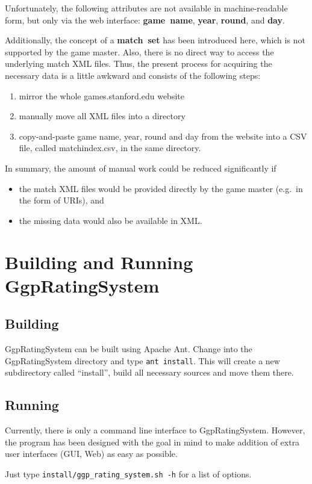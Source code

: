 \documentclass[a4paper,10pt]{article}
\begin{document}
Unfortunately, the following attributes are not available in machine-readable form, but only via the web interface:
\textbf{game~name}, \textbf{year}, \textbf{round}, and \textbf{day}.

Additionally, the concept of a \textbf{match~set} has been introduced here, which is not supported by the game master. Also, there is no direct way to access the underlying match XML files. Thus, the present process for acquiring the necessary data is a little awkward and consists of the following steps:
\begin{enumerate}
 \item mirror the whole games.stanford.edu website
 \item manually move all XML files into a directory
 \item copy-and-paste game name, year, round and day from the website into a CSV file, called matchindex.csv, in the same directory.
\end{enumerate}

In summary, the amount of manual work could be reduced significantly if 
\begin{itemize}
	\item the match XML files would be provided directly by the game master (e.g.\ in the form of URIs), and
	\item the missing data would also be available in XML.
\end{itemize}


\section{Building and Running GgpRatingSystem}
\subsection{Building}
GgpRatingSystem can be built using Apache Ant. Change into the GgpRatingSystem directory and type \texttt{ant install}. This will create a new subdirectory called ``install'', build all necessary sources and move them there.

\subsection{Running}
Currently, there is only a command line interface to GgpRatingSystem. However, the program has been designed with the goal in mind to make addition of extra user interfaces (GUI, Web) as easy as possible.

Just type \texttt{install/ggp\_rating\_system.sh -h} for a list of options.
\end{document}
